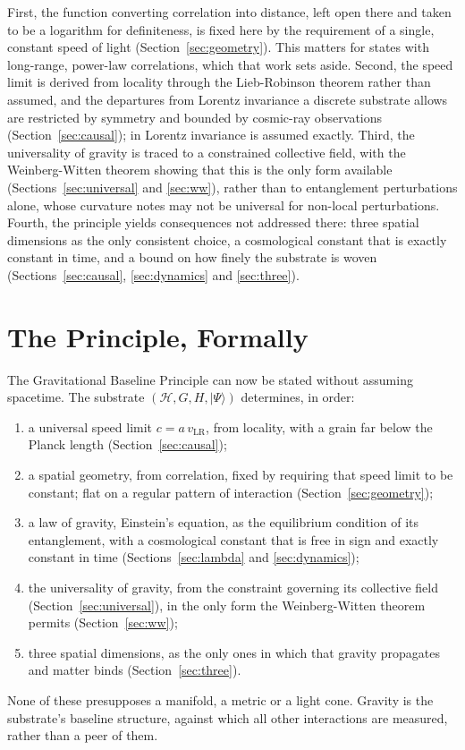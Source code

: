 \documentclass[aps,prd,onecolumn,nofootinbib,superscriptaddress]{revtex4-2}
\begin{document}
First, the function converting correlation into distance, left open there and taken to be a logarithm for definiteness, is fixed here by the requirement of a single, constant speed of light (Section~\ref{sec:geometry}). This matters for states with long-range, power-law correlations, which that work sets aside. Second, the speed limit is derived from locality through the Lieb-Robinson theorem rather than assumed, and the departures from Lorentz invariance a discrete substrate allows are restricted by symmetry and bounded by cosmic-ray observations (Section~\ref{sec:causal}); in \cite{cao2018} Lorentz invariance is assumed exactly. Third, the universality of gravity is traced to a constrained collective field, with the Weinberg-Witten theorem showing that this is the only form available (Sections~\ref{sec:universal} and \ref{sec:ww}), rather than to entanglement perturbations alone, whose curvature \cite{cao2017} notes may not be universal for non-local perturbations. Fourth, the principle yields consequences not addressed there: three spatial dimensions as the only consistent choice, a cosmological constant that is exactly constant in time, and a bound on how finely the substrate is woven (Sections~\ref{sec:causal}, \ref{sec:dynamics} and \ref{sec:three}).

\section{The Principle, Formally}
\label{sec:principle}

The Gravitational Baseline Principle can now be stated without assuming spacetime. The substrate $(\mathcal{H}, G, H, |\Psi\rangle)$ determines, in order:
\begin{enumerate}
\item a universal speed limit $c = a\,v_{\mathrm{LR}}$, from locality, with a grain far below the Planck length (Section~\ref{sec:causal});
\item a spatial geometry, from correlation, fixed by requiring that speed limit to be constant; flat on a regular pattern of interaction (Section~\ref{sec:geometry});
\item a law of gravity, Einstein's equation, as the equilibrium condition of its entanglement, with a cosmological constant that is free in sign and exactly constant in time (Sections~\ref{sec:lambda} and \ref{sec:dynamics});
\item the universality of gravity, from the constraint governing its collective field (Section~\ref{sec:universal}), in the only form the Weinberg-Witten theorem permits (Section~\ref{sec:ww});
\item three spatial dimensions, as the only ones in which that gravity propagates and matter binds (Section~\ref{sec:three}).
\end{enumerate}
None of these presupposes a manifold, a metric or a light cone. Gravity is the substrate's baseline structure, against which all other interactions are measured, rather than a peer of them.
\end{document}
